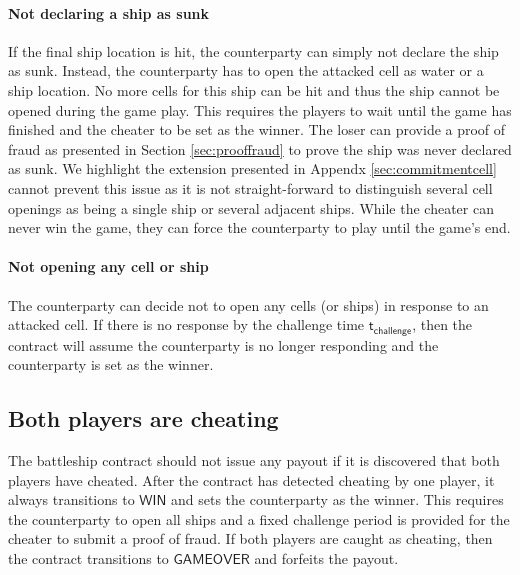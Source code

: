 \documentclass{llncs}
\newcommand{\gamewinner}{\mathsf{WIN}}
\newcommand{\gamefinished}{\mathsf{GAMEOVER}}
\newcommand{\timechallenge}{\mathsf{t}_{\mathsf{challenge}}}
\begin{document}
\paragraph{Not declaring a ship as sunk}
If the final ship location is hit, the counterparty can simply not declare the ship as sunk.
Instead, the counterparty has to open the attacked cell as water or a ship location.
No more cells for this ship can be hit and thus the ship cannot be opened during the game play. 
This requires the players to wait until the game has finished and the cheater to be set as the winner. 
The loser can provide a proof of fraud as presented in Section \ref{sec:prooffraud} to prove the ship was never declared as sunk. 
We highlight the extension presented in Appendx \ref{sec:commitmentcell} cannot prevent this issue as it is not straight-forward to distinguish several cell openings as being a single ship or several adjacent ships.
While the cheater can never win the game,  they can force the counterparty to play until the game's end. 

\paragraph{Not opening any cell or ship}
The counterparty can decide not to open any cells (or ships) in response to an attacked cell. If there is no response by the challenge time $\timechallenge$, then the contract will assume the counterparty is no longer responding and the counterparty is set as the winner. 

\subsection{Both players are cheating} 

The battleship contract should not issue any payout if it is discovered that both players have cheated. 
After the contract has detected cheating by one player, it always transitions to $\gamewinner$ and sets the counterparty as the winner.
This requires the counterparty to open all ships and a fixed challenge period is provided for the cheater to submit a proof of fraud.
If both players are caught as cheating, then the contract transitions to $\gamefinished$ and forfeits the payout. 
\end{document}
